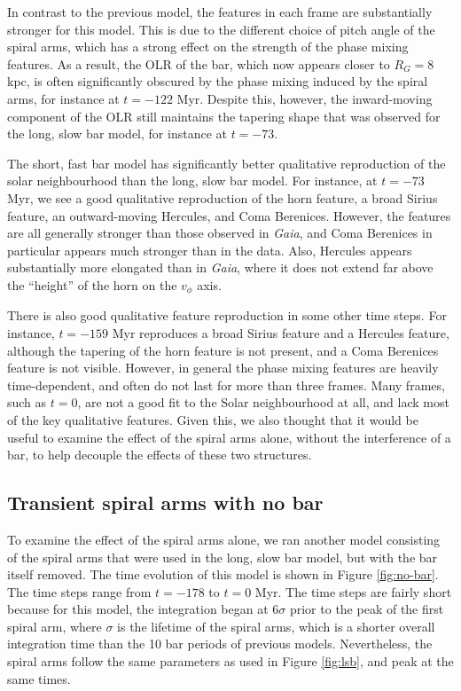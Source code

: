 \documentclass[10pt]{article}
\begin{document}
In contrast to the previous model, the features in each frame are substantially stronger for this model. This is due to the different choice of pitch angle of the spiral arms, which has a strong effect on the strength of the phase mixing features. As a result, the OLR of the bar, which now appears closer to $R_G = 8$ kpc, is often significantly obscured by the phase mixing induced by the spiral arms, for instance at $t = -122$ Myr. Despite this, however, the inward-moving component of the OLR still maintains the tapering shape that was observed for the long, slow bar model, for instance at $t = -73$. 

The short, fast bar model has significantly better qualitative reproduction of the solar neighbourhood than the long, slow bar model. For instance, at $t = -73$ Myr, we see a good qualitative reproduction of the horn feature, a broad Sirius feature, an outward-moving Hercules, and Coma  Berenices. However, the features are all generally stronger than those observed in \textit{Gaia}, and Coma Berenices in particular appears much stronger than in the data. Also, Hercules appears substantially more elongated than in \textit{Gaia}, where it does not extend far above the ``height'' of the horn on the $v_\phi$ axis.

There is also good qualitative feature reproduction in some other time steps. For instance, $t = -159$ Myr reproduces a broad Sirius feature and a Hercules feature, although the tapering of the horn feature is not present, and a Coma Berenices feature is not visible. However, in general the phase mixing features are heavily time-dependent, and often do not last for more than three frames. Many frames, such as $t = 0$, are not a good fit to the Solar neighbourhood at all, and lack most of the key qualitative features. Given this, we also thought that it would be useful to examine the effect of the spiral arms alone, without the interference of a bar, to help decouple the effects of these two structures.

\subsection{Transient spiral arms with no bar}
To examine the effect of the spiral arms alone, we ran another model consisting of the spiral arms that were used in the long, slow bar model, but with the bar itself removed. The time evolution of this model is shown in Figure \ref{fig:no-bar}. The time steps range from $t = -178$ to $t = 0$ Myr. The time steps are fairly short because for this model, the integration began at $6 \sigma$ prior to the peak of the first spiral arm, where $\sigma$ is the lifetime of the spiral arms, which is a shorter overall integration time than the 10 bar periods of previous models. Nevertheless, the spiral arms follow the same parameters as used in Figure \ref{fig:lsb}, and peak at the same times. 
\end{document}
